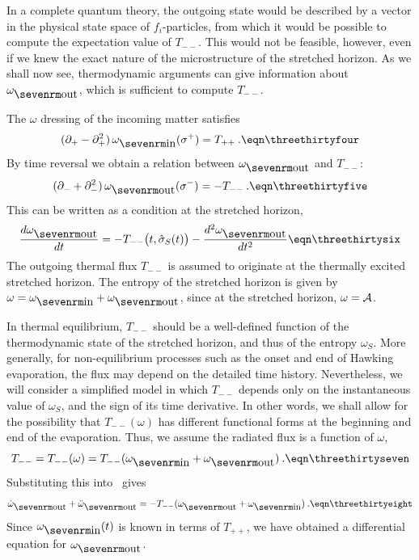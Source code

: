 In a complete quantum theory, the outgoing state would be described
by a vector in the physical state space of $f_i$-particles, from
which it would be possible to compute the expectation value of
$T_{--}$.  This would not be feasible, however, even if we knew the
exact nature of the microstructure of the stretched horizon.  As we
shall now see, thermodynamic arguments can give information about
$\omega_{\out}$, which is sufficient to compute $T_{--}$.

The $\omega$ dressing of the incoming matter satisfies
$$
( \pa_+ - \pa^2_+ )\, \omega_{\inn}(\sp) = T_{++} \>.
\eqn\threethirtyfour
$$
By time reversal we obtain a relation between $\omega_{\out}$ and
$T_{--}$:
$$
(\pa_- + \pa^2_-)\, \omega_{\out}(\sm) = -T_{--} \>.
\eqn\threethirtyfive
$$
This can be written as a condition at the stretched horizon,
$$
{d\omega_{\out} \over dt} =
-T_{--}\bigl(t, {\hat \sigma}_S(t)\bigr)
- {d^2 \omega_{\out} \over dt^2}
\eqn\threethirtysix
$$
The outgoing thermal flux $T_{--}$ is assumed to originate at the
thermally excited stretched horizon.  The entropy of the stretched
horizon is given by $\omega = \omega_{\inn} + \omega_{\out}$, since
at the stretched horizon, $\omega = {\cal A}$.

In thermal equilibrium, $T_{--}$ should be a well-defined function of
the thermodynamic state of the stretched horizon, and thus of the
entropy $\omega_S$.  More generally, for non-equilibrium processes
such as the onset and end of Hawking evaporation, the flux may depend
on the detailed time history.  Nevertheless, we will consider a
simplified model in which $T_{--}$ depends only on the instantaneous
value of $\omega_S$, and the sign of its time derivative.  In other
words, we shall allow for the possibility that $T_{--}(\omega)$ has
different functional forms at the beginning and end of the
evaporation.  Thus, we assume the radiated flux is a function of
$\omega$,
$$
T_{--} = T_{--}(\omega) = T_{--}(\omega_{\inn}
+ \omega_{\out}) \>.
\eqn\threethirtyseven
$$
Substituting this into \threethirtysix\ gives
$$
{\dot \omega}_{\out} + {\ddot \omega}_{\out}
= -T_{--}(\omega_{\out} + \omega_{\inn}) \>.
\eqn\threethirtyeight
$$
Since $\omega_{\inn}(t)$ is known in terms of $T_{++}$, we have
obtained a differential equation for $\omega_{\out}$.

